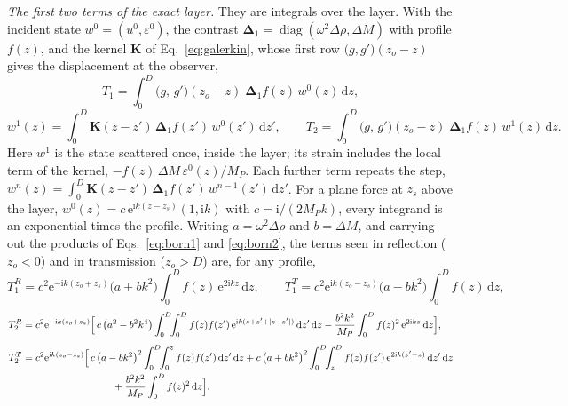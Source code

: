 \documentclass[preprint,review,12pt]{elsarticle}
\newcommand{\bK}{\mathbf{K}}
\newcommand{\bD}{\boldsymbol{\Delta}}
\newcommand{\dd}{\mathrm{d}}
\begin{document}
\emph{The first two terms of the exact layer.} They are integrals over the layer. With the incident
state $w^0=(u^0,\varepsilon^0)$, the contrast $\bD_1=\operatorname{diag}(\omega^2\Delta\rho,\Delta M)$
with profile $f(z)$, and the kernel $\bK$ of Eq.~\eqref{eq:galerkin}, whose first row
$\bigl(g,g'\bigr)(z_o-z)$ gives the displacement at the observer,
\begin{equation}\label{eq:born1}
  T_1=\int_0^D\bigl(g,\,g'\bigr)(z_o-z)\;\bD_1f(z)\,w^0(z)\,\dd z ,
\end{equation}
\begin{equation}\label{eq:born2}
  w^1(z)=\int_0^D\bK(z-z')\,\bD_1f(z')\,w^0(z')\,\dd z',\qquad
  T_2=\int_0^D\bigl(g,\,g'\bigr)(z_o-z)\;\bD_1f(z)\,w^1(z)\,\dd z .
\end{equation}
Here $w^1$ is the state scattered once, inside the layer; its strain includes the local term of the
kernel, $-f(z)\,\Delta M\,\varepsilon^0(z)/M_P$. Each further term repeats the step,
$w^n(z)=\int_0^D\bK(z-z')\,\bD_1f(z')\,w^{n-1}(z')\,\dd z'$. For a plane force at $z_s$ above the layer,
$w^0(z)=c\,\mathrm{e}^{\mathrm{i}k(z-z_s)}(1,\mathrm{i}k)$ with $c=\mathrm{i}/(2M_Pk)$, every integrand
is an exponential times the profile. Writing $a=\omega^2\Delta\rho$ and $b=\Delta M$, and carrying out
the products of Eqs.~\eqref{eq:born1} and \eqref{eq:born2}, the terms seen in reflection ($z_o<0$) and
in transmission ($z_o>D$) are, for any profile,
\begin{equation}\label{eq:born1explicit}
  T_1^{R}=c^2\mathrm{e}^{-\mathrm{i}k(z_o+z_s)}\bigl(a+bk^2\bigr)\int_0^Df(z)\,\mathrm{e}^{2\mathrm{i}kz}\,\dd z,
  \qquad
  T_1^{T}=c^2\mathrm{e}^{\mathrm{i}k(z_o-z_s)}\bigl(a-bk^2\bigr)\int_0^Df(z)\,\dd z,
\end{equation}
\begin{equation}\label{eq:born2explicit}
\begin{aligned}
  T_2^{R}&=c^2\mathrm{e}^{-\mathrm{i}k(z_o+z_s)}\Bigl[\,c\,\bigl(a^2-b^2k^4\bigr)
     \int_0^D\!\!\int_0^Df(z)f(z')\,\mathrm{e}^{\mathrm{i}k(z+z'+|z-z'|)}\,\dd z'\,\dd z
     -\frac{b^2k^2}{M_P}\int_0^Df(z)^2\,\mathrm{e}^{2\mathrm{i}kz}\,\dd z\Bigr],\\[4pt]
  T_2^{T}&=c^2\mathrm{e}^{\mathrm{i}k(z_o-z_s)}\Bigl[\,c\,\bigl(a-bk^2\bigr)^2
     \int_0^D\!\!\int_0^{z}f(z)f(z')\,\dd z'\,\dd z
     +c\,\bigl(a+bk^2\bigr)^2\int_0^D\!\!\int_z^{D}f(z)f(z')\,\mathrm{e}^{2\mathrm{i}k(z'-z)}\,\dd z'\,\dd z\\
     &\hspace{9em}+\frac{b^2k^2}{M_P}\int_0^Df(z)^2\,\dd z\Bigr].
\end{aligned}
\end{equation}
\end{document}
